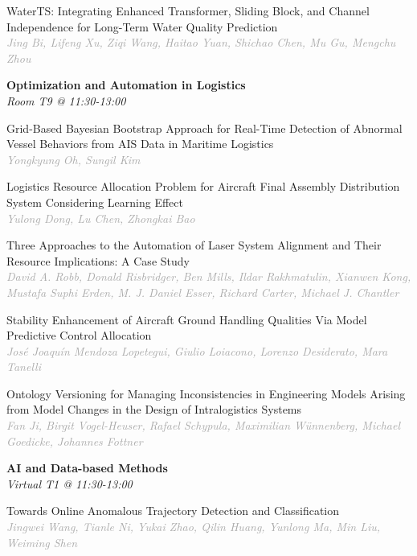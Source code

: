 \begin{multicols*}{2}
\small WaterTS: Integrating Enhanced Transformer, Sliding Block, and Channel Independence for Long-Term Water Quality Prediction\\ 
\footnotesize \textcolor{darkgray}{\textit{Jing Bi, Lifeng  Xu, Ziqi  Wang, Haitao  Yuan, Shichao  Chen, Mu  Gu, Mengchu  Zhou}}

\normalsize \textbf{Optimization and Automation in Logistics}\\
\small \textit{Room T9 @ 11:30-13:00}

\small Grid-Based Bayesian Bootstrap Approach for Real-Time Detection of Abnormal Vessel Behaviors from AIS Data in Maritime Logistics\\ 
\footnotesize \textcolor{darkgray}{\textit{Yongkyung Oh, Sungil  Kim}}

\small Logistics Resource Allocation Problem for Aircraft Final Assembly Distribution System Considering Learning Effect\\ 
\footnotesize \textcolor{darkgray}{\textit{Yulong Dong, Lu  Chen, Zhongkai  Bao}}

\small Three Approaches to the Automation of Laser System Alignment and Their Resource Implications: A Case Study\\ 
\footnotesize \textcolor{darkgray}{\textit{David A. Robb, Donald  Risbridger, Ben  Mills, Ildar  Rakhmatulin, Xianwen  Kong, Mustafa Suphi  Erden, M. J. Daniel  Esser, Richard  Carter, Michael J.  Chantler}}

\small Stability Enhancement of Aircraft Ground Handling Qualities Via Model Predictive Control Allocation\\ 
\footnotesize \textcolor{darkgray}{\textit{José Joaquín Mendoza Lopetegui, Giulio  Loiacono, Lorenzo  Desiderato, Mara  Tanelli}}

\small Ontology Versioning for Managing Inconsistencies in Engineering Models Arising from Model Changes in the Design of Intralogistics Systems\\ 
\footnotesize \textcolor{darkgray}{\textit{Fan Ji, Birgit  Vogel-Heuser, Rafael  Schypula, Maximilian  Wünnenberg, Michael  Goedicke, Johannes  Fottner}}

\normalsize \textbf{AI and Data-based Methods}\\
\small \textit{Virtual T1 @ 11:30-13:00}

\small Towards Online Anomalous Trajectory Detection and Classification\\ 
\footnotesize \textcolor{darkgray}{\textit{Jingwei Wang, Tianle  Ni, Yukai  Zhao, Qilin  Huang, Yunlong  Ma, Min  Liu, Weiming  Shen}}


\end{multicols*}
